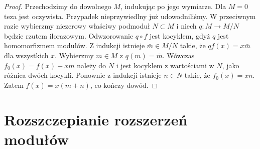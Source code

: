 \begin{proof}
Przechodzimy do dowolnego $M$, indukując po jego wymiarze. Dla $M=0$ teza jest oczywista. Przypadek nieprzywiedlny już udowodniliśmy. W przeciwnym razie wybierzmy niezerowy właściwy podmoduł $N\subset M$ i niech $q:M\to M/N$ będzie rzutem ilorazowym. Odwzorowanie $q\circ f$ jest kocyklem, gdyż $q$ jest homomorfizmem modułów. Z indukcji istnieje $\bar m\in M/N$ takie, że $qf(x)=x\bar m$ dla wszystkich $x$. Wybierzmy $m\in M$ z $q(m)=\bar m$. Wówczas $f_0(x)=f(x)-xm$ należy do $N$ i jest kocyklem z wartościami w $N$, jako różnica dwóch kocykli. Ponownie z indukcji istnieje $n\in N$ takie, że $f_0(x)=xn$. Zatem $f(x)=x(m+n)$, co kończy dowód.
\end{proof}

\section{Rozszczepianie rozszerzeń modułów}

